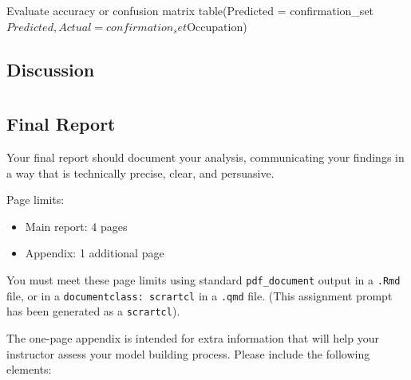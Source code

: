 \documentclass[
  letterpaper,
  DIV=11,
  numbers=noendperiod]{scrartcl}
\providecommand{\tightlist}{%
  \setlength{\itemsep}{0pt}\setlength{\parskip}{0pt}}\usepackage{longtable,booktabs,array}
\begin{document}
Evaluate accuracy or confusion matrix table(Predicted =
confirmation\_set\(Predicted, Actual = confirmation_set\)Occupation)

\subsection{Discussion}\label{discussion}

\section{}\label{section}

\section{}\label{section-1}

\section{}\label{section-2}

\section{}\label{section-3}

\subsection{Final Report}\label{final-report}

Your final report should document your analysis, communicating your
findings in a way that is technically precise, clear, and persuasive.

Page limits:

\begin{itemize}
\tightlist
\item
  Main report: 4 pages
\item
  Appendix: 1 additional page
\end{itemize}

You must meet these page limits using standard \texttt{pdf\_document}
output in a \texttt{.Rmd} file, or in a
\texttt{documentclass:\ scrartcl} in a \texttt{.qmd} file. (This
assignment prompt has been generated as a \texttt{scrartcl}).

The one-page appendix is intended for extra information that will help
your instructor assess your model building process. Please include the
following elements:
\end{document}
